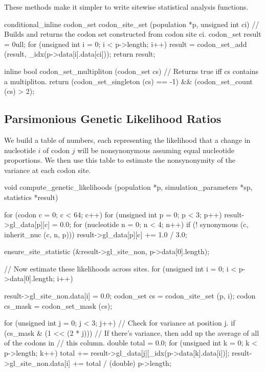 \documentclass{article}
\begin{document}
      These methods make it simpler to write sitewise statistical analysis
      functions.

\begin{ccode}
conditional_inline codon_set codon_site_set (population *p, unsigned int ci) {
  // Builds and returns the codon set constructed from codon site ci.
  codon_set result = 0ull;
  for (unsigned int i = 0; i < p->length; i++)
    result = codon_set_add (result, _idx(p->data[i].data[ci]));
  return result;
}

inline bool codon_set_multipliton (codon_set cs) {
  // Returns true iff cs contains a multipliton.
  return (codon_set_singleton (cs) == -1) && (codon_set_count (cs) > 2);
}
\end{ccode}

    \subsection{Parsimonious Genetic Likelihood Ratios}
      \label{sec:genetic-likelihoods}

      We build a table of numbers, each representing the likelihood that a
      change in nucleotide $i$ of codon $j$ will be nonsynonymous assuming equal
      nucleotide proportions. We then use this table to estimate the
      nonsynonymity of the variance at each codon site.

\begin{ccode}
void compute_genetic_likelihoods (population *p, simulation_parameters *sp, statistics *result) {
  for (codon c = 0; c < 64; c++)
    for (unsigned int p = 0; p < 3; p++) {
      result->gl_data[p][c] = 0.0;
      for (nucleotide n = 0; n < 4; n++)
	if (! synonymous (c, inherit_nuc (c, n, p)))
	  result->gl_data[p][c] += 1.0 / 3.0;
    }

  ensure_site_statistic (&result->gl_site_non, p->data[0].length);

  // Now estimate these likelihoods across sites.
  for (unsigned int i = 0; i < p->data[0].length; i++) {
    result->gl_site_non.data[i] = 0.0;
    codon_set	cs	= codon_site_set (p, i);
    codon	cs_mask	= codon_set_mask (cs);

    for (unsigned int j = 0; j < 3; j++)
      // Check for variance at position j.
      if (cs_mask & (1 << (2 * j))) {
	// If there's variance, then add up the average of all of the codons in
	// this column.
	double total = 0.0;
	for (unsigned int k = 0; k < p->length; k++)
	  total += result->gl_data[j][_idx(p->data[k].data[i])];
	result->gl_site_non.data[i] += total / (double) p->length;
      }
  }
}
\end{ccode}
\end{document}
